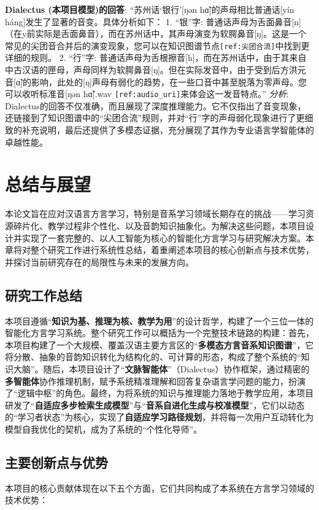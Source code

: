 \textbf{Dialectus (本项目模型)的回答}:
“苏州话‘银行’[ŋən hɑ̃]的声母相比普通话[yín háng]发生了显著的音变。具体分析如下：
1.  “银”字: 普通话声母为舌面鼻音[n]（在y前实际是舌面鼻音），而在苏州话中，其声母演变为软腭鼻音[ŋ]。这是一个常见的尖团音合并后的演变现象，您可以在知识图谱节点\texttt{[ref:尖团合流]}中找到更详细的规则。
2.  “行”字: 普通话声母为舌根擦音[h]，而在苏州话中，由于其来自中古汉语的匣母，声母同样为软腭鼻音[ŋ]。但在实际发音中，由于受到后方洪元音[ɑ̃]的影响，此处的[ŋ]声母有弱化的趋势，在一些口音中甚至脱落为零声母。您可以收听标准音[ŋən hɑ̃].wav \texttt{[ref:audio\_uri]}来体会这一发音特点。”
\textit{分析}: Dialectus的回答不仅准确，而且展现了深度推理能力。它不仅指出了音变现象，还链接到了知识图谱中的“尖团合流”规则，并对“行”字的声母弱化现象进行了更细致的补充说明，最后还提供了多模态证据，充分展现了其作为专业语言学智能体的卓越性能。
\chapter{总结与展望}

本论文旨在应对汉语言方言学习，特别是音系学习领域长期存在的挑战——学习资源碎片化、教学过程非个性化、以及音韵知识抽象化。为解决这些问题，本项目设计并实现了一套完整的、以人工智能为核心的智能化方言学习与研究解决方案。本章将对整个研究工作进行系统性总结，着重阐述本项目的核心创新点与技术优势，并探讨当前研究存在的局限性与未来的发展方向。

\section{研究工作总结}
本项目遵循“\textbf{知识为基、推理为核、教学为用}”的设计哲学，构建了一个三位一体的智能化方言学习系统。整个研究工作可以概括为一个完整技术链路的构建：首先，本项目构建了一个大规模、覆盖汉语主要方言区的“\textbf{多模态方言音系知识图谱}”，它将分散、抽象的音韵知识转化为结构化的、可计算的形态，构成了整个系统的“知识大脑”。随后，本项目设计了“\textbf{文脉智能体}”（Dialectus）协作框架，通过精密的\textbf{多智能体}协作推理机制，赋予系统精准理解和回答复杂语言学问题的能力，扮演了“逻辑中枢”的角色。最终，为将系统的知识与推理能力落地于教学应用，本项目研发了“\textbf{自适应多步检索生成模型}”与“\textbf{音系自进化生成与校准模型}”，它们以动态的“学习者状态”为核心，实现了\textbf{自适应学习路径规划}，并将每一次用户互动转化为模型自我优化的契机，成为了系统的“个性化导师”。

\section{主要创新点与优势}
本项目的核心贡献体现在以下五个方面，它们共同构成了本系统在方言学习领域的技术优势：

